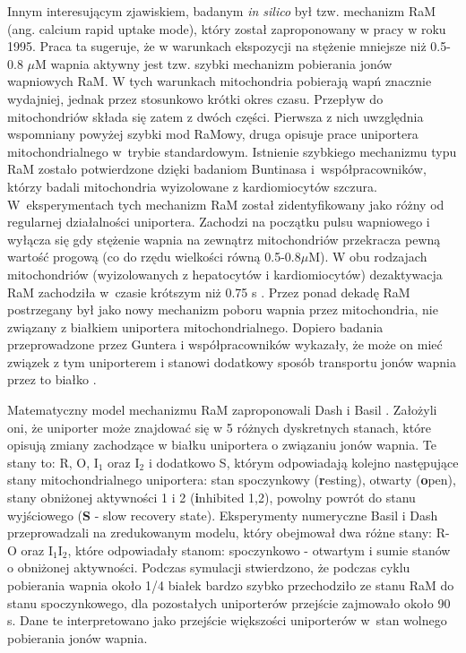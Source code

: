 Innym interesującym zjawiskiem, badanym \emph{in silico} był tzw. mechanizm RaM (ang. calcium rapid uptake mode), który został zaproponowany w pracy \cite{Sparagna1995} w roku 1995. Praca ta sugeruje, że w warunkach ekspozycji na stężenie mniejsze niż 0.5-0.8 $\mu$M wapnia aktywny jest tzw. szybki mechanizm pobierania jonów wapniowych RaM. W tych warunkach mitochondria pobierają wapń znacznie wydajniej, jednak przez stosunkowo krótki okres czasu. Przepływ do mitochondriów składa się zatem z dwóch części. Pierwsza z nich uwzględnia wspomniany powyżej szybki mod RaMowy, druga opisuje prace uniportera mitochondrialnego w~trybie standardowym. Istnienie szybkiego mechanizmu  typu RaM zostało potwierdzone dzięki badaniom Buntinasa i~współpracowników, którzy badali mitochondria wyizolowane z kardiomiocytów szczura. W~eksperymentach tych mechanizm RaM został zidentyfikowany jako różny od regularnej działalności uniportera. Zachodzi na początku pulsu wapniowego i wyłącza się gdy stężenie wapnia na zewnątrz mitochondriów przekracza pewną wartość progową (co do rzędu wielkości równą 0.5-0.8$\mu$M). W obu rodzajach mitochondriów (wyizolowanych z hepatocytów i kardiomiocytów) dezaktywacja RaM zachodziła w~czasie krótszym niż 0.75 s \cite{Buntinas2001}. Przez ponad dekadę RaM postrzegany był jako nowy mechanizm  poboru wapnia przez mitochondria, nie związany z białkiem uniportera mitochondrialnego. Dopiero badania przeprowadzone przez Guntera i współpracowników wykazały, że może on mieć związek z tym uniporterem i stanowi dodatkowy sposób transportu jonów wapnia przez to białko \cite{Gunter2004}.


Matematyczny model mechanizmu RaM zaproponowali Dash i Basil \cite{Bazil2011,Dash2009}. Założyli oni, że uniporter może znajdować się w 5 różnych dyskretnych stanach, które opisują zmiany zachodzące w białku uniportera o związaniu jonów wapnia. Te stany to: R, O, I$_1$ oraz I$_2$ i dodatkowo S, którym odpowiadają kolejno następujące stany mitochondrialnego uniportera: stan spoczynkowy (\textbf{r}esting), otwarty (\textbf{o}pen), stany obniżonej aktywności 1 i 2 (\textbf{i}nhibited 1,2), powolny powrót do stanu wyjściowego (\textbf{S} - slow recovery state). Eksperymenty numeryczne Basil i Dash przeprowadzali na zredukowanym modelu, który obejmował dwa różne stany: R-O oraz I$_1$I$_2$, które odpowiadały stanom: spoczynkowo - otwartym i sumie stanów o obniżonej aktywności. Podczas symulacji stwierdzono, że podczas cyklu pobierania wapnia około 1/4 białek bardzo szybko przechodziło ze stanu RaM do stanu spoczynkowego, dla pozostałych uniporterów przejście zajmowało około 90 s. Dane te interpretowano jako przejście większości uniporterów w~stan wolnego pobierania jonów wapnia.


